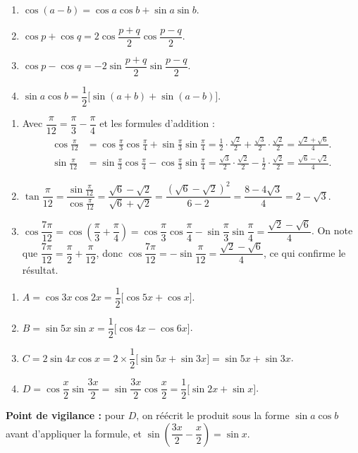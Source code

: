 \documentclass[11pt]{article}
\begin{document}
\begin{corrige}
\begin{enumerate}
\item $\cos(a-b) = \cos a \cos b + \sin a \sin b$.
\item $\cos p + \cos q = 2\cos\dfrac{p+q}{2}\cos\dfrac{p-q}{2}$.
\item $\cos p - \cos q = -2\sin\dfrac{p+q}{2}\sin\dfrac{p-q}{2}$.
\item $\sin a \cos b = \dfrac{1}{2}\big[\sin(a+b) + \sin(a-b)\big]$.
\end{enumerate}
\end{corrige}

\begin{corrige}
\begin{enumerate}
\item Avec $\dfrac{\pi}{12} = \dfrac{\pi}{3} - \dfrac{\pi}{4}$ et les formules d'addition :
\begin{align*}
\cos\frac{\pi}{12} &= \cos\frac{\pi}{3}\cos\frac{\pi}{4} + \sin\frac{\pi}{3}\sin\frac{\pi}{4} = \frac{1}{2}\cdot\frac{\sqrt{2}}{2} + \frac{\sqrt{3}}{2}\cdot\frac{\sqrt{2}}{2} = \frac{\sqrt{2}+\sqrt{6}}{4}.\\
\sin\frac{\pi}{12} &= \sin\frac{\pi}{3}\cos\frac{\pi}{4} - \cos\frac{\pi}{3}\sin\frac{\pi}{4} = \frac{\sqrt{3}}{2}\cdot\frac{\sqrt{2}}{2} - \frac{1}{2}\cdot\frac{\sqrt{2}}{2} = \frac{\sqrt{6}-\sqrt{2}}{4}.
\end{align*}
\item $\tan\dfrac{\pi}{12} = \dfrac{\sin\frac{\pi}{12}}{\cos\frac{\pi}{12}} = \dfrac{\sqrt{6}-\sqrt{2}}{\sqrt{6}+\sqrt{2}} = \dfrac{(\sqrt{6}-\sqrt{2})^2}{6-2} = \dfrac{8 - 4\sqrt{3}}{4} = 2 - \sqrt{3}$.
\item $\cos\dfrac{7\pi}{12} = \cos\left(\dfrac{\pi}{3}+\dfrac{\pi}{4}\right) = \cos\dfrac{\pi}{3}\cos\dfrac{\pi}{4} - \sin\dfrac{\pi}{3}\sin\dfrac{\pi}{4} = \dfrac{\sqrt{2}-\sqrt{6}}{4}$.
On note que $\dfrac{7\pi}{12} = \dfrac{\pi}{2} + \dfrac{\pi}{12}$, donc $\cos\dfrac{7\pi}{12} = -\sin\dfrac{\pi}{12} = \dfrac{\sqrt{2}-\sqrt{6}}{4}$, ce qui confirme le résultat.
\end{enumerate}
\end{corrige}

\begin{corrige}
\begin{enumerate}
\item $A = \cos 3x \cos 2x = \dfrac{1}{2}\big[\cos 5x + \cos x\big]$.
\item $B = \sin 5x \sin x = \dfrac{1}{2}\big[\cos 4x - \cos 6x\big]$.
\item $C = 2\sin 4x \cos x = 2\times\dfrac{1}{2}\big[\sin 5x + \sin 3x\big] = \sin 5x + \sin 3x$.
\item $D = \cos\dfrac{x}{2}\sin\dfrac{3x}{2} = \sin\dfrac{3x}{2}\cos\dfrac{x}{2} = \dfrac{1}{2}\big[\sin 2x + \sin x\big]$.
\end{enumerate}
\textbf{Point de vigilance :} pour $D$, on réécrit le produit sous la forme $\sin a \cos b$ avant d'appliquer la formule, et $\sin\left(\dfrac{3x}{2}-\dfrac{x}{2}\right) = \sin x$.
\end{corrige}
\end{document}
